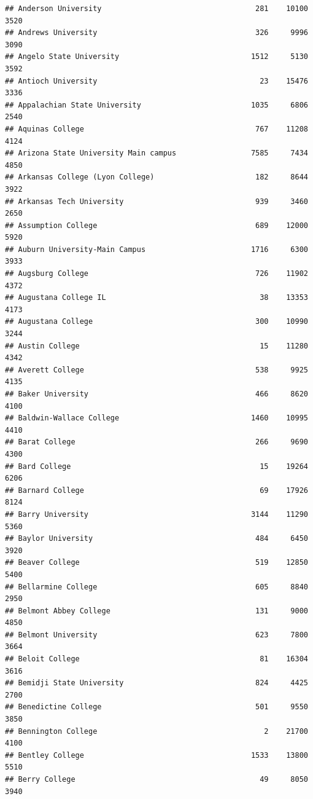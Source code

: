 \documentclass[
]{article}
\begin{document}
\begin{verbatim}
## Anderson University                                   281    10100       3520
## Andrews University                                    326     9996       3090
## Angelo State University                              1512     5130       3592
## Antioch University                                     23    15476       3336
## Appalachian State University                         1035     6806       2540
## Aquinas College                                       767    11208       4124
## Arizona State University Main campus                 7585     7434       4850
## Arkansas College (Lyon College)                       182     8644       3922
## Arkansas Tech University                              939     3460       2650
## Assumption College                                    689    12000       5920
## Auburn University-Main Campus                        1716     6300       3933
## Augsburg College                                      726    11902       4372
## Augustana College IL                                   38    13353       4173
## Augustana College                                     300    10990       3244
## Austin College                                         15    11280       4342
## Averett College                                       538     9925       4135
## Baker University                                      466     8620       4100
## Baldwin-Wallace College                              1460    10995       4410
## Barat College                                         266     9690       4300
## Bard College                                           15    19264       6206
## Barnard College                                        69    17926       8124
## Barry University                                     3144    11290       5360
## Baylor University                                     484     6450       3920
## Beaver College                                        519    12850       5400
## Bellarmine College                                    605     8840       2950
## Belmont Abbey College                                 131     9000       4850
## Belmont University                                    623     7800       3664
## Beloit College                                         81    16304       3616
## Bemidji State University                              824     4425       2700
## Benedictine College                                   501     9550       3850
## Bennington College                                      2    21700       4100
## Bentley College                                      1533    13800       5510
## Berry College                                          49     8050       3940

\end{verbatim}
\end{document}
